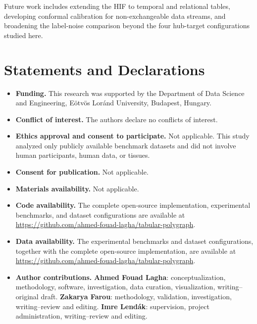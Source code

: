 \documentclass[pdflatex,sn-mathphys-num]{sn-jnl}
\theoremstyle{thmstyleone}%
\theoremstyle{thmstyletwo}%
\theoremstyle{thmstylethree}%
\begin{document}
Future work includes extending the HIF to temporal and relational tables, developing conformal calibration for non-exchangeable data streams, and broadening the label-noise comparison beyond the four hub-target configurations studied here.


\section*{Statements and Declarations}

\begin{itemize}
\item \textbf{Funding.} This research was supported by the Department of Data Science and Engineering, Eötvös Loránd University, Budapest, Hungary.
\item \textbf{Conflict of interest.} The authors declare no conflicts of interest.
\item \textbf{Ethics approval and consent to participate.} Not applicable. This study analyzed only publicly available benchmark datasets and did not involve human participants, human data, or tissues.
\item \textbf{Consent for publication.} Not applicable.
\item \textbf{Materials availability.} Not applicable.
\item \textbf{Code availability.} The complete open-source implementation, experimental benchmarks, and dataset configurations are available at \url{https://github.com/ahmed-fouad-lagha/tabular-polygraph}.
\item \textbf{Data availability.} The experimental benchmarks and dataset configurations, together with the complete open-source implementation, are available at \url{https://github.com/ahmed-fouad-lagha/tabular-polygraph}.
\item \textbf{Author contributions.} \textbf{Ahmed Fouad Lagha}: conceptualization, methodology, software, investigation, data curation, visualization, writing--original draft. \textbf{Zakarya Farou}: methodology, validation, investigation, writing--review and editing. \textbf{Imre Lend\'ak}: supervision, project administration, writing--review and editing.
\end{itemize}


\end{document}
